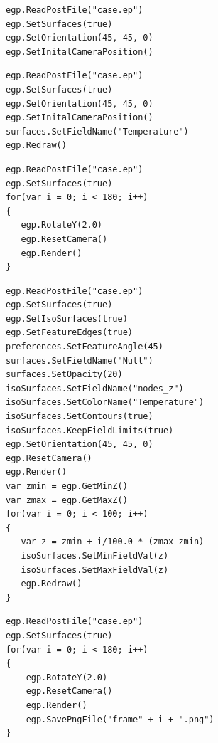 \documentclass[a4paper,12pt]{article}
\begin{document}
\vskip5mm
\begin{footnotesize}
\begin{verbatim}
egp.ReadPostFile("case.ep")
egp.SetSurfaces(true)
egp.SetOrientation(45, 45, 0)
egp.SetInitalCameraPosition()
\end{verbatim}
\end{footnotesize}

\vskip5mm
\begin{footnotesize}
\begin{verbatim}
egp.ReadPostFile("case.ep")
egp.SetSurfaces(true)
egp.SetOrientation(45, 45, 0)
egp.SetInitalCameraPosition()
surfaces.SetFieldName("Temperature")
egp.Redraw()
\end{verbatim}
\end{footnotesize}

\vskip5mm
\begin{footnotesize}
\begin{verbatim}
egp.ReadPostFile("case.ep")
egp.SetSurfaces(true)
for(var i = 0; i < 180; i++)
{
   egp.RotateY(2.0)
   egp.ResetCamera()
   egp.Render()
}
\end{verbatim}
\end{footnotesize}

\vskip5mm
\begin{footnotesize}
\begin{verbatim}
egp.ReadPostFile("case.ep")
egp.SetSurfaces(true)
egp.SetIsoSurfaces(true)
egp.SetFeatureEdges(true)
preferences.SetFeatureAngle(45)
surfaces.SetFieldName("Null")
surfaces.SetOpacity(20)
isoSurfaces.SetFieldName("nodes_z")
isoSurfaces.SetColorName("Temperature")
isoSurfaces.SetContours(true)
isoSurfaces.KeepFieldLimits(true)
egp.SetOrientation(45, 45, 0)
egp.ResetCamera()
egp.Render()
var zmin = egp.GetMinZ()
var zmax = egp.GetMaxZ()
for(var i = 0; i < 100; i++)
{
   var z = zmin + i/100.0 * (zmax-zmin)
   isoSurfaces.SetMinFieldVal(z)
   isoSurfaces.SetMaxFieldVal(z)
   egp.Redraw()
}
\end{verbatim}
\end{footnotesize}

\vskip5mm
\begin{footnotesize}
\begin{verbatim}
egp.ReadPostFile("case.ep")
egp.SetSurfaces(true)
for(var i = 0; i < 180; i++)
{
    egp.RotateY(2.0)
    egp.ResetCamera()
    egp.Render()
    egp.SavePngFile("frame" + i + ".png")
}
\end{verbatim}
\end{footnotesize}
\end{document}

